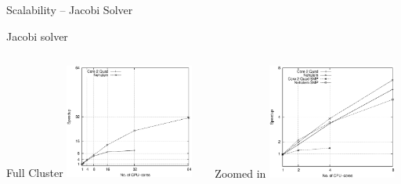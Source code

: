 \documentclass{beamer}
\begin{document}
\begin{frame}{Scalability -- Jacobi Solver}
\begin{center}
Jacobi solver
\end{center}

\begin{columns}
  \begin{column}{0.5\textwidth}
  \begin{center}
    \hspace{21px}Full Cluster
    \includegraphics[width=160px]{../gfx/JacobiStrong}
  \end{center}    
  \end{column}
  \begin{column}{0.5\textwidth}
  \begin{center}
    \hspace{23px}Zoomed in
    \includegraphics[width=160px]{../gfx/JacobiStrongSMP}
  \end{center}
  \end{column}
\end{columns}
\end{frame}

\end{document}
